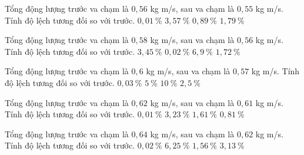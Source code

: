 \begin{ex}
Tổng động lượng trước va chạm là $0,56$ kg m/s, sau va chạm là $0,55$ kg m/s. Tính độ lệch tương đối so với trước.
\choice
{$0,01\ \mathrm{\%}$}
{$3,57\ \mathrm{\%}$}
{$0,89\ \mathrm{\%}$}
{\True $1,79\ \mathrm{\%}$}
\end{ex}

\begin{ex}
Tổng động lượng trước va chạm là $0,58$ kg m/s, sau va chạm là $0,56$ kg m/s. Tính độ lệch tương đối so với trước.
\choice
{\True $3,45\ \mathrm{\%}$}
{$0,02\ \mathrm{\%}$}
{$6,9\ \mathrm{\%}$}
{$1,72\ \mathrm{\%}$}
\end{ex}

\begin{ex}
Tổng động lượng trước va chạm là $0,6$ kg m/s, sau va chạm là $0,57$ kg m/s. Tính độ lệch tương đối so với trước.
\choice
{$0,03\ \mathrm{\%}$}
{\True $5\ \mathrm{\%}$}
{$10\ \mathrm{\%}$}
{$2,5\ \mathrm{\%}$}
\end{ex}

\begin{ex}
Tổng động lượng trước va chạm là $0,62$ kg m/s, sau va chạm là $0,61$ kg m/s. Tính độ lệch tương đối so với trước.
\choice
{$0,01\ \mathrm{\%}$}
{$3,23\ \mathrm{\%}$}
{\True $1,61\ \mathrm{\%}$}
{$0,81\ \mathrm{\%}$}
\end{ex}

\begin{ex}
Tổng động lượng trước va chạm là $0,64$ kg m/s, sau va chạm là $0,62$ kg m/s. Tính độ lệch tương đối so với trước.
\choice
{$0,02\ \mathrm{\%}$}
{$6,25\ \mathrm{\%}$}
{$1,56\ \mathrm{\%}$}
{\True $3,13\ \mathrm{\%}$}
\end{ex}

